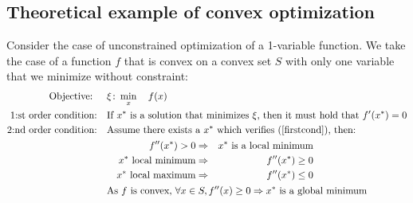 \documentclass[../convex_optimization.tex]{subfiles}
\begin{document}
\subsection{Theoretical example of convex optimization}
Consider the case of unconstrained optimization of a 1-variable function.
We take the case of a function $f$ that is convex on a convex set $S$
with only one variable that we minimize without constraint:
\begin{align}
    \text{Objective: } &\quad\xi\colon \min_{x} \quad f(x)
    \nonumber\\
    \text{1:st order condition:} &\quad
    \text{If $x^*$ is a solution that minimizes $\xi$,
    then it must hold that $f'(x^*) = 0$}\label{firstcond}\\
    \text{2:nd order condition:} &\quad
    \text{Assume there exists a $x^*$ which verifies (\ref{firstcond}), then:}
    \nonumber\\& \qquad
    \begin{aligned}
        f''(x^*) > 0 &\Rightarrow & x^* \text{ is a local minimum}\\
        x^* \text{ local minimum} & \Rightarrow & f''(x^*) \geq 0\\
        x^* \text{ local maximum} & \Rightarrow & f''(x^*) \leq 0
    \end{aligned}\\
    &\quad
    \text{As $f$ is convex, } \forall x \in S, f''(x) \geq 0
    \Rightarrow x^* \text{ is a global minimum}\nonumber
\end{align}


\newpage
\end{document}
